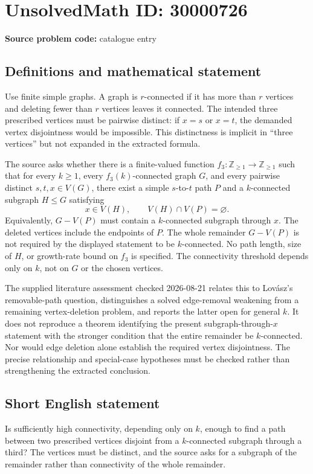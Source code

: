 \documentclass[11pt]{article}
\newcommand{\Z}{\mathbb{Z}}
\begin{document}
\section*{UnsolvedMath ID: 30000726}
\textbf{Source problem code:} catalogue entry
\subsection{Definitions and mathematical statement}
Use finite simple graphs. A graph is \(r\)-connected if it has more than \(r\) vertices and deleting fewer than \(r\) vertices leaves it connected. The intended three prescribed vertices must be pairwise distinct: if \(x=s\) or \(x=t\), the demanded vertex disjointness would be impossible. This distinctness is implicit in ``three vertices'' but not expanded in the extracted formula.

The source asks whether there is a finite-valued function \(f_3:\Z_{\geq1}\to\Z_{\geq1}\) such that for every \(k\geq1\), every \(f_3(k)\)-connected graph \(G\), and every pairwise distinct \(s,t,x\in V(G)\), there exist a simple \(s\)-to-\(t\) path \(P\) and a \(k\)-connected subgraph \(H\leq G\) satisfying
\[
x\in V(H),\qquad V(H)\cap V(P)=\varnothing.
\]
Equivalently, \(G-V(P)\) must contain a \(k\)-connected subgraph through \(x\). The deleted vertices include the endpoints of \(P\). The whole remainder \(G-V(P)\) is not required by the displayed statement to be \(k\)-connected. No path length, size of \(H\), or growth-rate bound on \(f_3\) is specified. The connectivity threshold depends only on \(k\), not on \(G\) or the chosen vertices.

The supplied literature assessment checked 2026-08-21 relates this to Lov\'asz's removable-path question, distinguishes a solved edge-removal weakening from a remaining vertex-deletion problem, and reports the latter open for general \(k\). It does not reproduce a theorem identifying the present subgraph-through-\(x\) statement with the stronger condition that the entire remainder be \(k\)-connected. Nor would edge deletion alone establish the required vertex disjointness. The precise relationship and special-case hypotheses must be checked rather than strengthening the extracted conclusion.
\subsection{Short English statement}
Is sufficiently high connectivity, depending only on \(k\), enough to find a path between two prescribed vertices disjoint from a \(k\)-connected subgraph through a third? The vertices must be distinct, and the source asks for a subgraph of the remainder rather than connectivity of the whole remainder.
\end{document}
